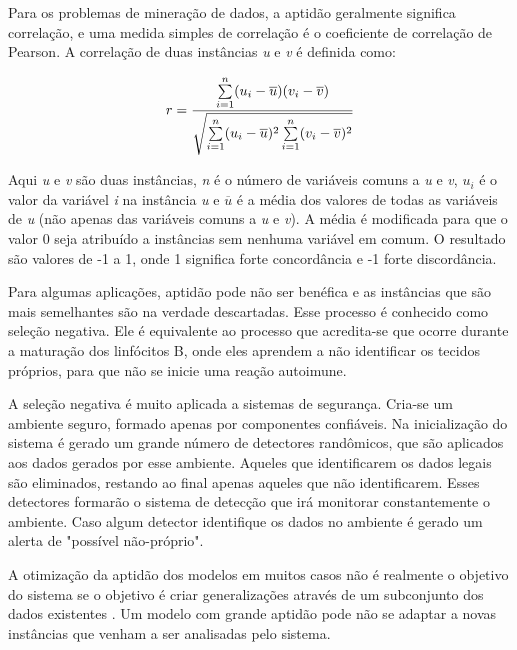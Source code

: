 Para os problemas de mineração de dados, a aptidão geralmente significa correlação, e uma medida simples de correlação é o coeficiente de correlação de Pearson. A correlação de duas instâncias \emph{u} e \emph{v} é definida como:

\begin{equation}
    \vspace{2mm}
r=\frac{
    \sum\limits_{i=1}^{n}
        (u_i-\overline{u})
        (v_i-\overline{v})
    }
    {\sqrt{
        \sum\limits_{i=1}^{n}
            (u_i-\overline{u})^2
        \sum\limits_{i=1}^{n}
            (v_i-\overline{v})^2
        }
    }
    \vspace{2mm}
\end{equation}

Aqui \emph{u} e \emph{v} são duas instâncias, \emph{n} é o número de variáveis comuns a \emph{u} e \emph{v}, \emph{$u_i$} é o valor da variável \emph{i} na instância \emph{u} e \emph{$\overline{u}$} é a média dos valores de todas as variáveis de \emph{u} (não apenas das variáveis comuns a \emph{u} e \emph{v}). A média é modificada para que o valor 0 seja atribuído a instâncias sem nenhuma variável em comum. O resultado são valores de -1 a 1, onde 1 significa forte concordância e -1 forte discordância.

Para algumas aplicações, aptidão pode não ser benéfica e as instâncias que são mais semelhantes são na verdade descartadas. Esse processo é conhecido como seleção negativa. Ele é equivalente ao processo que acredita-se que ocorre durante a maturação dos linfócitos B, onde eles aprendem a não identificar os tecidos próprios, para que não se inicie uma reação autoimune.

A seleção negativa é muito aplicada a sistemas de segurança. Cria-se um ambiente seguro, formado apenas por componentes confiáveis. Na inicialização do sistema é gerado um grande número de detectores randômicos, que são aplicados aos dados gerados por esse ambiente. Aqueles que identificarem os dados legais são eliminados, restando ao final apenas aqueles que não identificarem. Esses detectores formarão o sistema de detecção que irá monitorar constantemente o ambiente. Caso algum detector identifique os dados no ambiente é gerado um alerta de "possível não-próprio".

A otimização da aptidão dos modelos em muitos casos não é realmente o objetivo do sistema se o objetivo é criar generalizações através de um subconjunto dos dados existentes \cite{Hand2001}. Um modelo com grande aptidão pode não se adaptar a novas instâncias que venham a ser analisadas pelo sistema.


